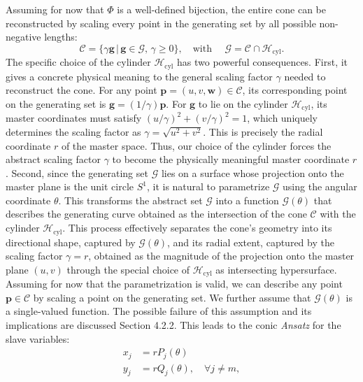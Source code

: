 \documentclass[a4paper,9pt,parskip=half,english]{article}
\theoremstyle{plain}
\theoremstyle{definition}
\newcommand{\vg}{\mathbf g}
\newcommand{\vp}{\mathbf p}
\newcommand{\vw}{\mathbf w}
\begin{document}
Assuming for now that $\Phi$ is a well-defined bijection, the entire cone can be reconstructed by scaling every point in the generating set by all possible non-negative lengths:
\begin{equation}
	\mathcal{C} = \{ \gamma \vg \, | \, \vg \in \mathcal{G}, \, \gamma \ge 0 \}, \quad \text{with } \quad \mathcal{G} = \mathcal{C} \cap \mathcal{H}_{\text{cyl}}.
\end{equation}
The specific choice of the cylinder $\mathcal{H}_{\textrm{cyl}}$ has two powerful consequences. First, it gives a concrete physical meaning to the general scaling factor $\gamma$ needed to reconstruct the cone. For any point $\vp=(u,v,\vw) \in \mathcal{C}$, its corresponding point on the generating set is $\vg= (1/\gamma) \vp$. For $\vg$ to lie on the cylinder $\mathcal{H}_{\textrm{cyl}}$, its master coordinates must satisfy $(u/\gamma)^2 + (v/\gamma)^2=1$, which uniquely determines the scaling factor as $\gamma = \sqrt{u^2+v^2}$. This is precisely the radial coordinate $r$ of the master space. Thus, our choice of the cylinder forces the abstract scaling factor $\gamma$ to become the physically meaningful master coordinate $r$. Second, since the generating set $\mathcal{G}$ lies on a surface whose projection onto the master plane is the unit circle $S^1$, it is natural to parametrize $\mathcal{G}$ using the angular coordinate $\theta$. This transforms the abstract set $\mathcal{G}$ into a function $\mathcal{G}(\theta)$ that describes the generating curve obtained as the intersection of the cone $\mathcal{C}$ with the cylinder $\mathcal{H}_{\textrm{cyl}}$. 
This process effectively separates the cone's geometry into its directional shape, captured by $\mathcal{G}(\theta)$, and its radial extent, captured by the scaling factor $\gamma=r$, obtained as the magnitude of the projection onto the master plane $(u,v)$ through the special choice of $\mathcal{H}_{\textrm{cyl}}$ as intersecting hypersurface.
Assuming for now that the parametrization is valid, we can describe any point $\vp \in \mathcal{C}$ by scaling a point on the generating set. We further assume that $\mathcal{G}(\theta)$ is a single-valued function. The possible failure of this assumption and its implications are discussed Section 4.2.2. This leads to the conic \textit{Ansatz} for the slave variables:
\begin{equation}
	\begin{aligned} \label{eq:conicAnsatz}
		x_j &= r P_j(\theta) \\ 
		y_j &= r Q_j(\theta), \quad \forall j \neq m,
	\end{aligned}
\end{equation}
\end{document}
